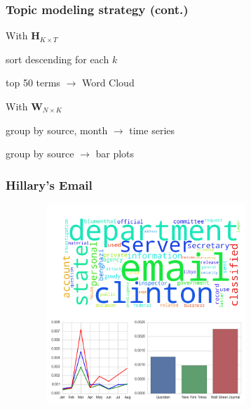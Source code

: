 \documentclass[11pt]{beamer}
\newenvironment{innerlist}[1][\enskip\textbullet]%
        {\begin{compactenum}[#1]}{\end{compactenum}}
\begin{document}

\begin{frame}
\frametitle{Topic modeling strategy (cont.)}


\vspace{5mm}

\begin{itemize}
	\item With $\mathbf{H}_{K \times T}$
	\vspace{2mm}
	\begin{innerlist}
		\item sort descending for each $k$ 
		\item top 50 terms $\rightarrow$ Word Cloud
	\end{innerlist}
	\vspace{6mm}
	\item With $\mathbf{W}_{N \times K}$
	\vspace{2mm}
	\begin{innerlist}
		\item group by source, month $\rightarrow$ time series
		\item group by source  $\rightarrow$ bar plots
	\end{innerlist}
\end{itemize}


\end{frame}



\begin{frame}
\frametitle{Hillary's Email}

\begin{figure}
\centering
\includegraphics[width=85mm,height=75mm]{figures/source_topic2.png}
\end{figure} 

\end{frame}
\end{document}
